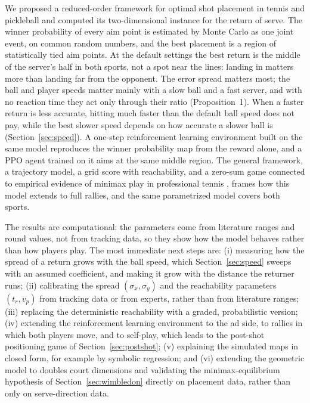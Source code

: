   We proposed a reduced-order framework for optimal shot placement in tennis and
  pickleball and computed its two-dimensional instance for the return of serve.
  The winner probability of every aim point is estimated by Monte Carlo as one
  joint event, on common random numbers, and the best placement is a region of
  statistically tied aim points. At the default settings the best return is the
  middle of the server's half in both sports, not a spot near the lines:
  landing in matters more than landing far from the opponent. The error spread
  matters most; the ball and player speeds matter mainly with a slow ball and a
  fast server, and with no reaction time they act only through their ratio
  (Proposition~1). When a faster return is less accurate, hitting much faster
  than the default ball speed does not pay, while the best slower speed depends
  on how accurate a slower ball is (Section~\ref{sec:speed}). A one-step
  reinforcement learning environment built on the same model reproduces the
  winner probability map from the reward alone, and a PPO agent trained on it
  aims at the same middle region. The general framework, a trajectory model, a
  grid score with reachability, and a zero-sum game connected to empirical
  evidence of minimax play in professional tennis \cite{walker2001minimax},
  frames how this model extends to full rallies, and the same parametrized
  model covers both sports.

  The results are computational: the parameters come from literature ranges and
  round values, not from tracking data, so they show how the model behaves
  rather than how players play. The most immediate next steps are: (i)
  measuring how the spread of a return grows with the ball speed, which
  Section~\ref{sec:speed} sweeps with an assumed coefficient, and making it grow
  with the distance the returner runs; (ii) calibrating the spread $(\sigma_x,
  \sigma_y)$ and the reachability parameters $(t_r, v_p)$ from tracking data or
  from experts, rather than from literature ranges; (iii) replacing the
  deterministic reachability with a graded, probabilistic version; (iv)
  extending the reinforcement learning environment to the ad side, to rallies
  in which both players move, and to self-play, which leads to the post-shot
  positioning game of Section~\ref{sec:postshot}; (v) explaining the simulated
  maps in closed form, for example by symbolic regression; and (vi) extending
  the geometric model to doubles court dimensions and validating the
  minimax-equilibrium hypothesis of Section~\ref{sec:wimbledon} directly on
  placement data, rather than only on serve-direction data.

